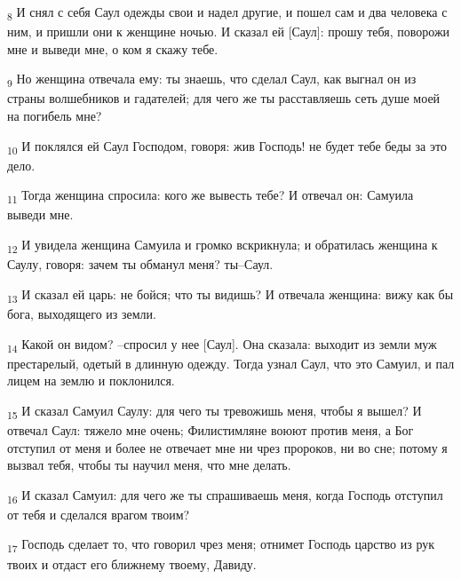 \begin{tcolorbox}
\textsubscript{8} И снял с себя Саул одежды свои и надел другие, и пошел сам и два человека с ним, и пришли они к женщине ночью. И сказал ей [Саул]: прошу тебя, поворожи мне и выведи мне, о ком я скажу тебе.
\end{tcolorbox}
\begin{tcolorbox}
\textsubscript{9} Но женщина отвечала ему: ты знаешь, что сделал Саул, как выгнал он из страны волшебников и гадателей; для чего же ты расставляешь сеть душе моей на погибель мне?
\end{tcolorbox}
\begin{tcolorbox}
\textsubscript{10} И поклялся ей Саул Господом, говоря: жив Господь! не будет тебе беды за это дело.
\end{tcolorbox}
\begin{tcolorbox}
\textsubscript{11} Тогда женщина спросила: кого же вывесть тебе? И отвечал он: Самуила выведи мне.
\end{tcolorbox}
\begin{tcolorbox}
\textsubscript{12} И увидела женщина Самуила и громко вскрикнула; и обратилась женщина к Саулу, говоря: зачем ты обманул меня? ты--Саул.
\end{tcolorbox}
\begin{tcolorbox}
\textsubscript{13} И сказал ей царь: не бойся; что ты видишь? И отвечала женщина: вижу как бы бога, выходящего из земли.
\end{tcolorbox}
\begin{tcolorbox}
\textsubscript{14} Какой он видом? --спросил у нее [Саул]. Она сказала: выходит из земли муж престарелый, одетый в длинную одежду. Тогда узнал Саул, что это Самуил, и пал лицем на землю и поклонился.
\end{tcolorbox}
\begin{tcolorbox}
\textsubscript{15} И сказал Самуил Саулу: для чего ты тревожишь меня, чтобы я вышел? И отвечал Саул: тяжело мне очень; Филистимляне воюют против меня, а Бог отступил от меня и более не отвечает мне ни чрез пророков, ни во сне; потому я вызвал тебя, чтобы ты научил меня, что мне делать.
\end{tcolorbox}
\begin{tcolorbox}
\textsubscript{16} И сказал Самуил: для чего же ты спрашиваешь меня, когда Господь отступил от тебя и сделался врагом твоим?
\end{tcolorbox}
\begin{tcolorbox}
\textsubscript{17} Господь сделает то, что говорил чрез меня; отнимет Господь царство из рук твоих и отдаст его ближнему твоему, Давиду.
\end{tcolorbox}
